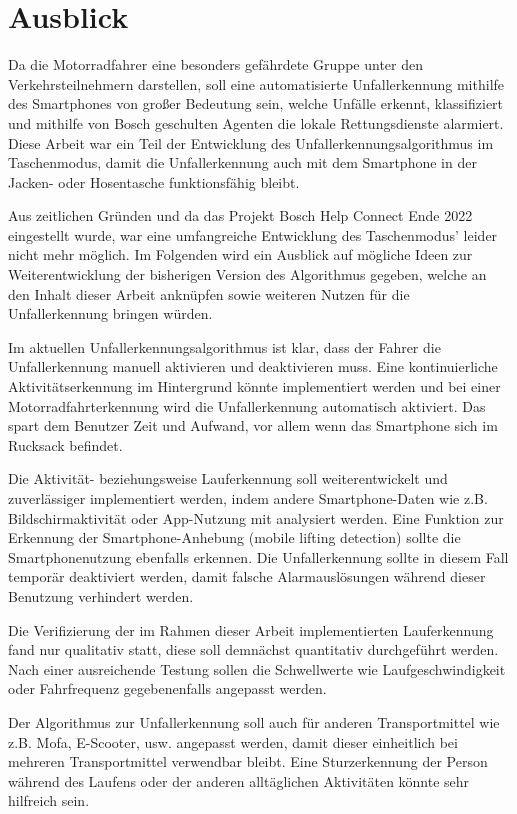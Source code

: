 \chapter{Ausblick}

Da die Motorradfahrer eine besonders gefährdete Gruppe unter den Verkehrsteilnehmern darstellen, soll eine automatisierte Unfallerkennung mithilfe des Smartphones von großer Bedeutung sein, welche Unfälle erkennt, klassifiziert und mithilfe von Bosch geschulten Agenten die lokale Rettungsdienste alarmiert. Diese Arbeit war ein Teil der Entwicklung des Unfallerkennungsalgorithmus im Taschenmodus, damit die Unfallerkennung auch mit dem Smartphone in der Jacken- oder Hosentasche funktionsfähig bleibt.

Aus zeitlichen Gründen und da das Projekt \glqq Bosch Help Connect\grqq{} Ende 2022 eingestellt wurde, war eine umfangreiche Entwicklung des Taschenmodus' leider nicht mehr möglich.
Im Folgenden wird ein Ausblick auf mögliche Ideen zur Weiterentwicklung der bisherigen Version des Algorithmus gegeben, welche an den Inhalt dieser Arbeit anknüpfen sowie weiteren Nutzen für die Unfallerkennung bringen würden.

Im aktuellen Unfallerkennungsalgorithmus ist klar, dass der Fahrer die Unfallerkennung manuell aktivieren und deaktivieren muss. Eine kontinuierliche Aktivit\-äts\-er\-kenn\-ung im Hintergrund könnte implementiert werden und bei einer Motorradfahrterkennung wird die Unfallerkennung automatisch aktiviert. Das spart dem Benutzer Zeit und Aufwand, vor allem wenn das Smartphone sich im Rucksack befindet. %

Die Aktivität- beziehungsweise Lauferkennung soll weiterentwickelt und zuverlässiger implementiert werden, indem andere Smartphone-Daten wie z.B. Bildschirmaktivität oder App-Nutzung mit analysiert werden.
Eine Funktion zur Erkennung der Smart\-phone-Anhebung (mobile lifting detection) sollte die Smartphonenutzung ebenfalls erkennen. Die Unfallerkennung sollte in diesem Fall temporär deaktiviert werden, damit falsche Alarmauslösungen während dieser Benutzung verhindert werden.

Die Verifizierung der im Rahmen dieser Arbeit implementierten Lauferkennung fand nur qualitativ statt, diese soll demnächst quantitativ durchgeführt werden. Nach einer ausreichende Testung sollen die Schwellwerte wie Laufgeschwindigkeit oder Fahrfrequenz gegebenenfalls angepasst werden.

Der Algorithmus zur Unfallerkennung soll auch für anderen Transportmittel wie z.B. Mofa, E-Scooter, usw. angepasst werden, damit dieser einheitlich bei mehreren Transportmittel verwendbar bleibt. Eine Sturzerkennung der Person während des Laufens oder der anderen alltäglichen Aktivitäten könnte sehr hilfreich sein.

